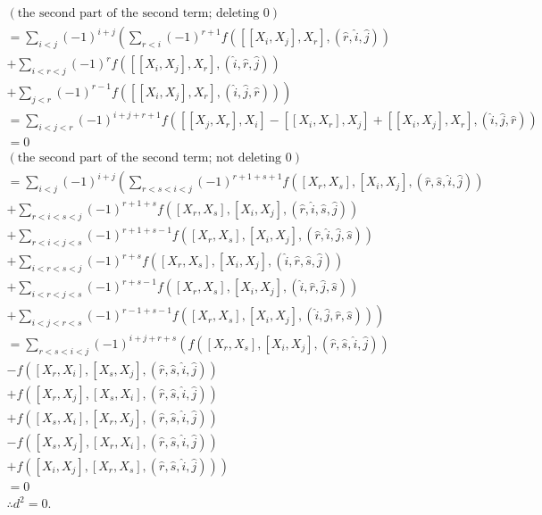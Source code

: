 \documentclass{article}
\begin{document}
\begin{eqnarray*}
  (\textrm{the second part of the second term; deleting 0}) \\
  = \sum_{i < j} (-1)^{i + j} \left( \sum_{r < i} (-1)^{r + 1} f([[X_i, X_j], X_r], (\hat{r}, \hat{i}, \hat{j})) \right. \\ 
    \left. + \sum_{i < r < j} (-1)^{r} f([[X_i, X_j], X_r], (\hat{i}, \hat{r}, \hat{j})) \right. \\ 
    \left. + \sum_{j < r} (-1)^{r - 1} f([[X_i, X_j], X_r], (\hat{i}, \hat{j}, \hat{r})) \right) \\
  = \sum_{i < j < r} (-1)^{i + j + r + 1} f([[X_j, X_r], X_i] - [[X_i, X_r], X_j] + [[X_i, X_j], X_r], (\hat{i}, \hat{j}, \hat{r})) \\
  = 0 \\
  (\textrm{the second part of the second term; not deleting 0}) \\
  = \sum_{i < j} (-1)^{i + j} \left( \sum_{r < s < i < j} (-1)^{r + 1 + s + 1} f([X_r, X_s], [X_i, X_j], (\hat{r}, \hat{s}, \hat{i}, \hat{j})) \right. \\
    \left. + \sum_{r < i < s < j} (-1)^{r + 1 + s} f([X_r, X_s], [X_i, X_j], (\hat{r}, \hat{i}, \hat{s}, \hat{j})) \right. \\
    \left. + \sum_{r < i < j < s} (-1)^{r + 1 + s - 1} f([X_r, X_s], [X_i, X_j], (\hat{r}, \hat{i}, \hat{j}, \hat{s})) \right. \\
    \left. + \sum_{i < r < s < j} (-1)^{r + s} f([X_r, X_s], [X_i, X_j], (\hat{i}, \hat{r}, \hat{s}, \hat{j})) \right. \\
    \left. + \sum_{i < r < j < s} (-1)^{r + s - 1} f([X_r, X_s], [X_i, X_j], (\hat{i}, \hat{r}, \hat{j}, \hat{s})) \right. \\
    \left. + \sum_{i < j < r < s} (-1)^{r - 1 + s - 1} f([X_r, X_s], [X_i, X_j], (\hat{i}, \hat{j}, \hat{r}, \hat{s})) \right) \\
  = \sum_{r < s < i < j} (-1)^{i + j + r + s} \left( f([X_r, X_s], [X_i, X_j], (\hat{r}, \hat{s}, \hat{i}, \hat{j})) \right. \\
    \left. - f([X_r, X_i], [X_s, X_j], (\hat{r}, \hat{s}, \hat{i}, \hat{j})) \right. \\
    \left. + f([X_r, X_j], [X_s, X_i], (\hat{r}, \hat{s}, \hat{i}, \hat{j})) \right. \\
    \left. + f([X_s, X_i], [X_r, X_j], (\hat{r}, \hat{s}, \hat{i}, \hat{j})) \right. \\
    \left. - f([X_s, X_j], [X_r, X_i], (\hat{r}, \hat{s}, \hat{i}, \hat{j})) \right. \\
    \left. + f([X_i, X_j], [X_r, X_s], (\hat{r}, \hat{s}, \hat{i}, \hat{j})) \right) \\
  = 0 \\
  \therefore d^2 = 0.
\end{eqnarray*}
\end{document}
